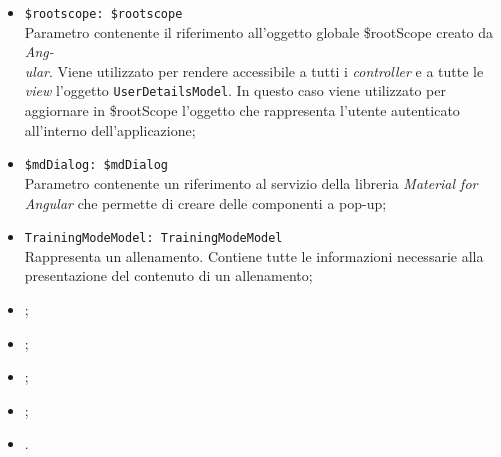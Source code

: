\begin{itemize}
\begin{itemize}
\begin{itemize}
			\item \texttt{\$rootscope: \$rootscope}\\
			Parametro contenente il riferimento all'oggetto globale \$rootScope creato da \textit{Ang-\\ular{}}. Viene utilizzato per rendere accessibile a tutti i \textit{controller} e a tutte le \textit{view} l'oggetto \texttt{UserDetailsModel}. In questo caso viene utilizzato per aggiornare in \$rootScope l'oggetto che rappresenta l'utente autenticato all'interno dell'applicazione;
			\item \texttt{\$mdDialog: \$mdDialog} \\
			Parametro contenente un riferimento al servizio della libreria \textit{Material for Angular} che permette di creare delle componenti a pop-up;
			\item \texttt{TrainingModeModel: TrainingModeModel} \\ Rappresenta un allenamento. Contiene tutte le informazioni necessarie alla presentazione del contenuto di un allenamento;
			\item \timeoutP;
			\item \locationP;
			\item \routeparamsP;
			\item \errorinfomodelP;
			\item \questionsserviceP.
		\end{itemize}
		

\end{itemize}
\end{itemize}
